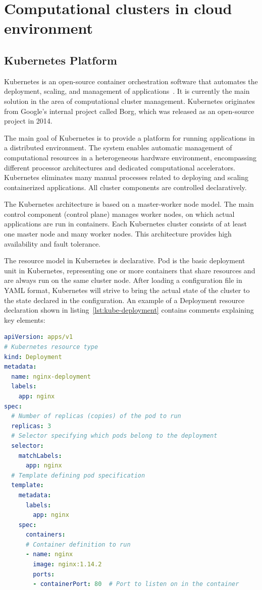 \section{Computational clusters in cloud environment}

\subsection{Kubernetes Platform}

Kubernetes is an open-source container orchestration software that automates the deployment, scaling, and management of applications~\cite{kubernetes, container_orchestration}.
It is currently the main solution in the area of computational cluster management.
Kubernetes originates from Google's internal project called Borg, which was released as an open-source project in 2014.

The main goal of Kubernetes is to provide a platform for running applications in a distributed environment.
The system enables automatic management of computational resources in a heterogeneous hardware environment, encompassing different processor architectures and dedicated computational accelerators.
Kubernetes eliminates many manual processes related to deploying and scaling containerized applications.
All cluster components are controlled declaratively.

The Kubernetes architecture is based on a master-worker node model.
The main control component (control plane) manages worker nodes, on which actual applications are run in containers.
Each Kubernetes cluster consists of at least one master node and many worker nodes.
This architecture provides high availability and fault tolerance.

The resource model in Kubernetes is declarative.
Pod is the basic deployment unit in Kubernetes, representing one or more containers that share resources and are always run on the same cluster node.
After loading a configuration file in YAML format, Kubernetes will strive to bring the actual state of the cluster to the state declared in the configuration.
An example of a Deployment resource declaration shown in listing~\ref{lst:kube-deployment} contains comments explaining key elements:

\begin{lstlisting}[language=yaml,caption={Example Deployment declaration in Kubernetes},label={lst:kube-deployment}]
apiVersion: apps/v1
# Kubernetes resource type
kind: Deployment 
metadata:
  name: nginx-deployment
  labels:
    app: nginx
spec:
  # Number of replicas (copies) of the pod to run
  replicas: 3
  # Selector specifying which pods belong to the deployment
  selector:
    matchLabels:
      app: nginx
  # Template defining pod specification
  template:
    metadata:
      labels:
        app: nginx
    spec:
      containers:
      # Container definition to run
      - name: nginx
        image: nginx:1.14.2
        ports:
        - containerPort: 80  # Port to listen on in the container
\end{lstlisting}

